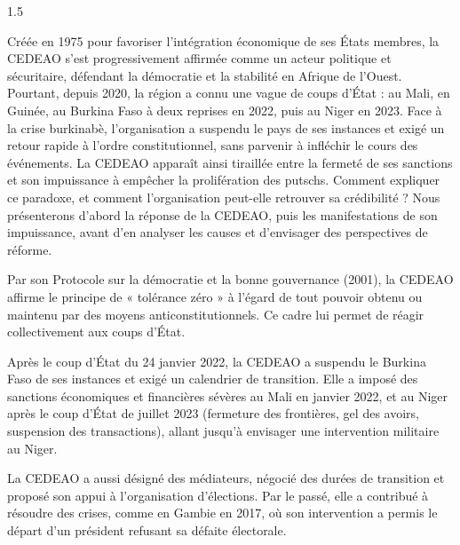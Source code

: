 \documentclass[12pt]{article}
\begin{document}
\begin{spacing}{1.5}


Créée en 1975 pour favoriser l'intégration économique de ses États membres, la CEDEAO s'est progressivement affirmée comme un acteur politique et sécuritaire, défendant la démocratie et la stabilité en Afrique de l'Ouest. Pourtant, depuis 2020, la région a connu une vague de coups d'État : au Mali, en Guinée, au Burkina Faso à deux reprises en 2022, puis au Niger en 2023. Face à la crise burkinabè, l'organisation a suspendu le pays de ses instances et exigé un retour rapide à l'ordre constitutionnel, sans parvenir à infléchir le cours des événements. La CEDEAO apparaît ainsi tiraillée entre la fermeté de ses sanctions et son impuissance à empêcher la prolifération des putschs. Comment expliquer ce paradoxe, et comment l'organisation peut-elle retrouver sa crédibilité ? Nous présenterons d'abord la réponse de la CEDEAO, puis les manifestations de son impuissance, avant d'en analyser les causes et d'envisager des perspectives de réforme.


Par son Protocole sur la démocratie et la bonne gouvernance (2001), la CEDEAO affirme le principe de « tolérance zéro » à l'égard de tout pouvoir obtenu ou maintenu par des moyens anticonstitutionnels. Ce cadre lui permet de réagir collectivement aux coups d'État.

Après le coup d'État du 24 janvier 2022, la CEDEAO a suspendu le Burkina Faso de ses instances et exigé un calendrier de transition. Elle a imposé des sanctions économiques et financières sévères au Mali en janvier 2022, et au Niger après le coup d'État de juillet 2023 (fermeture des frontières, gel des avoirs, suspension des transactions), allant jusqu'à envisager une intervention militaire au Niger.

La CEDEAO a aussi désigné des médiateurs, négocié des durées de transition et proposé son appui à l'organisation d'élections. Par le passé, elle a contribué à résoudre des crises, comme en Gambie en 2017, où son intervention a permis le départ d'un président refusant sa défaite électorale.



\end{spacing}
\end{document}
